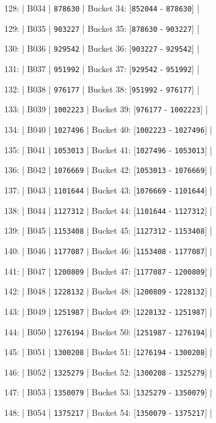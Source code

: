 \documentclass[11pt,a4paper]{article}
\begin{document}
128: | B034 | \texttt{878630} | Bucket 34: [\texttt{852044} - \texttt{878630}] |

129: | B035 | \texttt{903227} | Bucket 35: [\texttt{878630} - \texttt{903227}] |

130: | B036 | \texttt{929542} | Bucket 36: [\texttt{903227} - \texttt{929542}] |

131: | B037 | \texttt{951992} | Bucket 37: [\texttt{929542} - \texttt{951992}] |

132: | B038 | \texttt{976177} | Bucket 38: [\texttt{951992} - \texttt{976177}] |

133: | B039 | \texttt{1002223} | Bucket 39: [\texttt{976177} - \texttt{1002223}] |

134: | B040 | \texttt{1027496} | Bucket 40: [\texttt{1002223} - \texttt{1027496}] |

135: | B041 | \texttt{1053013} | Bucket 41: [\texttt{1027496} - \texttt{1053013}] |

136: | B042 | \texttt{1076669} | Bucket 42: [\texttt{1053013} - \texttt{1076669}] |

137: | B043 | \texttt{1101644} | Bucket 43: [\texttt{1076669} - \texttt{1101644}] |

138: | B044 | \texttt{1127312} | Bucket 44: [\texttt{1101644} - \texttt{1127312}] |

139: | B045 | \texttt{1153408} | Bucket 45: [\texttt{1127312} - \texttt{1153408}] |

140: | B046 | \texttt{1177087} | Bucket 46: [\texttt{1153408} - \texttt{1177087}] |

141: | B047 | \texttt{1200809} | Bucket 47: [\texttt{1177087} - \texttt{1200809}] |

142: | B048 | \texttt{1228132} | Bucket 48: [\texttt{1200809} - \texttt{1228132}] |

143: | B049 | \texttt{1251987} | Bucket 49: [\texttt{1228132} - \texttt{1251987}] |

144: | B050 | \texttt{1276194} | Bucket 50: [\texttt{1251987} - \texttt{1276194}] |

145: | B051 | \texttt{1300208} | Bucket 51: [\texttt{1276194} - \texttt{1300208}] |

146: | B052 | \texttt{1325279} | Bucket 52: [\texttt{1300208} - \texttt{1325279}] |

147: | B053 | \texttt{1350079} | Bucket 53: [\texttt{1325279} - \texttt{1350079}] |

148: | B054 | \texttt{1375217} | Bucket 54: [\texttt{1350079} - \texttt{1375217}] |
\end{document}
